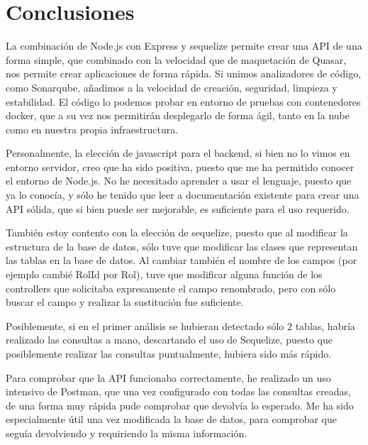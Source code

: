 \documentclass[11pt,spanish,listoffigures,listoftables]{tfgetsinf}
\begin{document}

\chapter{Conclusiones}

La combinación de Node.js con Express y sequelize permite crear una API de una forma simple, que combinado con la velocidad que de maquetación de Quasar, nos permite crear aplicaciones de forma rápida.
Si unimos analizadores de código, como Sonarqube, añadimos a la velocidad de creación, seguridad, limpieza y estabilidad. 
El código lo podemos probar en entorno de pruebas con contenedores docker, que a su vez nos permitirán desplegarlo de forma ágil, tanto en la nube como en nuestra propia infraestructura.

Personalmente, la elección de javascript para el backend, si bien no lo vimos en entorno servidor, creo que ha sido positiva, puesto que me ha permitido conocer el entorno de Node.js. 
No he necesitado aprender a usar el lenguaje, puesto que ya lo conocía, y sólo he tenido que leer a documentación existente para crear una API sólida, que si bien puede ser mejorable, es suficiente para el uso requerido.

También estoy contento con la elección de sequelize, puesto que al modificar la estructura de la base de datos, sólo tuve que modificar las clases que representan las tablas en la base de datos. 
Al cambiar también el nombre de los campos (por ejemplo cambié RolId por Rol), tuve que modificar alguna función de los controllers que solicitaba expresamente el campo renombrado, pero con sólo buscar el campo y realizar la sustitución fue suficiente.

Posiblemente, si en el primer análisis se hubieran detectado sólo 2 tablas, habría realizado las consultas a mano, descartando el uso de Sequelize, puesto que posiblemente realizar las consultas puntualmente, hubiera sido más rápido.

Para comprobar que la API funcionaba correctamente, he realizado un uso intensivo de Postman, que una vez configurado con todas las consultas creadas, de una forma muy rápida pude comprobar que devolvía lo esperado.
Me ha sido especialmente útil una vez modificada la base de datos, para comprobar que seguía devolviendo y requiriendo la misma información. 
\end{document}
